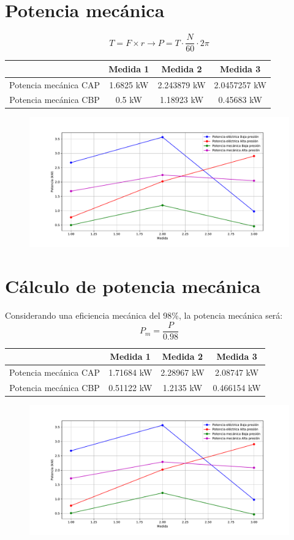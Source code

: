 \documentclass[a4paper,12pt]{report}
\begin{document}
\section{Potencia mecánica}
$$
T = F \times r \longrightarrow P = T\cdot \frac{N}{60} \cdot 2\pi
$$
\begin{center}
\begin{tabular}{|c|c|c|c|}
\hline 
 & Medida 1 & Medida 2 & Medida 3 \\ 
\hline 
Potencia mecánica CAP & 1.6825 kW & 2.243879 kW & 2.0457257 kW\\ 
\hline 
Potencia mecánica CBP & 0.5 kW & 1.18923 kW & 0.45683 kW \\ 
\hline 
\end{tabular} 
\end{center}
\begin{figure}[H]
\centering
\includegraphics[scale=0.6]{potencia1.pdf}
\end{figure}
\section{Cálculo de potencia mecánica}
Considerando una eficiencia mecánica del 98\%, la potencia mecánica será:
$$
P_{m} = \frac{P}{0.98}
$$
\begin{center}
\begin{tabular}{|c|c|c|c|}
\hline 
 & Medida 1 & Medida 2 & Medida 3 \\ 
\hline 
Potencia mecánica CAP & 1.71684 kW & 2.28967 kW & 2.08747 kW\\ 
\hline 
Potencia mecánica CBP & 0.51122 kW & 1.2135 kW & 0.466154 kW \\ 
\hline 
\end{tabular} 
\end{center}
\begin{figure}[H]
\centering
\includegraphics[scale=0.6]{potencia2.pdf}
\end{figure}
\end{document}
